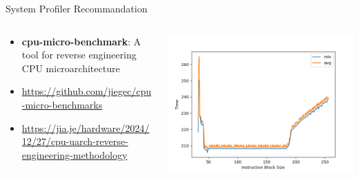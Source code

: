 \begin{frame}{System Profiler Recommandation}
    \begin{columns}
        \begin{column}{0.5\textwidth}
            \begin{itemize}
                \item \textbf{cpu-micro-benchmark}: A tool for reverse engineering CPU microarchitecture
                \item \footnotesize{\url{https://github.com/jiegec/cpu-micro-benchmarks}}
                \item \footnotesize{\url{https://jia.je/hardware/2024/12/27/cpu-uarch-reverse-engineering-methodology}}
            \end{itemize}
        \end{column}
        \begin{column}{0.5\textwidth}
            \centering
            \includegraphics[width=\textwidth]{img/intel_broadwell.png}
        \end{column}
    \end{columns}
\end{frame}